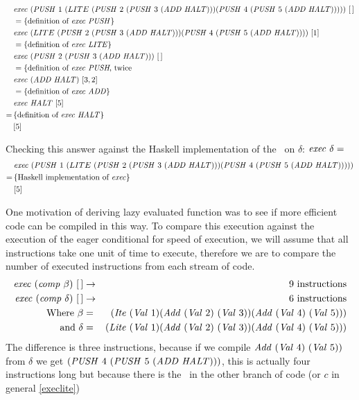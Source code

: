 \documentclass {article}
\begin{document}
\begin{align*}
&\mathit{exec\ } (\mathit{PUSH\ } 1\ (LITE\ (\mathit{PUSH\ } 2\ (\mathit{PUSH\ } 3\ (\mathit{ADD\ }  \mathit{HALT}))) (\mathit{PUSH\ } 4\ (\mathit{PUSH\ } 5\ (\mathit{ADD\ }  \mathit{HALT})))))\ [\, ] \\
&=\{\mbox{definition of \textit{exec}\ \textit{PUSH}} \} \\
&\mathit{exec\ } (LITE\ (\mathit{PUSH\ } 2\ (\mathit{PUSH\ } 3\ (\mathit{ADD\ }  \mathit{HALT}))) (\mathit{PUSH\ } 4\ (\mathit{PUSH\ } 5\ (\mathit{ADD\ }  \mathit{HALT}))))\ [1] \\
&=\{\mbox{definition of \textit{exec}\ \textit{LITE}} \} \\
&\mathit{exec\ } (\mathit{PUSH\ } 2\ (\mathit{PUSH\ } 3\ (\mathit{ADD\ }  \mathit{HALT})))\ [\, ] \\
&=\{\mbox{definition of \textit{exec}\ \textit{PUSH}, twice} \\
&\mathit{exec\ } (\mathit{ADD\ }  \mathit{HALT})\ [3, 2] \\
&=\{\mbox{definition of \textit{exec}\ \textit{ADD}} \} \\
&\mathit{exec\ } \mathit{HALT} \ [5] \\
=\, & \{\mbox{definition of \textit{exec}\ \textit{HALT}}\} \\
&[5]
\end{align*}

Checking this answer against the Haskell 
implementation of the \vm\ on $\delta$:
\( \mathit{exec\ } \delta = \)
\begin{align*}	
&\Exec (\PUSH 1\ (LITE\ 
	(\PUSH 2\ (\PUSH 3\ (\ADD  \HALT))) 
	(\PUSH 4\ (\PUSH 5\ (\ADD  \HALT))))) \\
=\, &\{ \mbox{Haskell implementation of \exec} \} \\
&[5]
\end{align*}

One motivation of deriving lazy evaluated function
was to see if more efficient code can be compiled
in this way. 
To compare this execution against the execution of 
the eager conditional for speed of execution,
we will assume that all instructions take one unit of time
to execute, therefore we are to compare the number of 
executed instructions from each stream of code.
\begin{eqnarray*}
\mathit{exec\ } (\mathit{comp\ } \beta)\ [\, ] &\rightarrow& \mbox{9 instructions} \\
\mathit{exec\ } (\mathit{comp\ } \delta)\ [\, ] &\rightarrow& \mbox{6 instructions} \\
\mbox{Where } \beta &=& (\mathit{Ite\ } (\mathit{Val\ } 1)(\mathit{Add\ } (\mathit{Val\ } 2)\ (\mathit{Val\ } 3))
									(\mathit{Add\ } (\mathit{Val\ } 4)\ (\mathit{Val\ } 5))) \\
\mbox{and } \delta &=& (\mathit{Lite\ } (\mathit{Val\ } 1)(\mathit{Add\ } (\mathit{Val\ } 2)\ (\mathit{Val\ } 3))
										(\mathit{Add\ } (\mathit{Val\ } 4)\ (\mathit{Val\ } 5))) \\
\end{eqnarray*}
The difference is three instructions, 
because if we compile  \( \mathit{Add\ } (\mathit{Val\ } 4)\ (\mathit{Val\ } 5)) \)
from $\delta$
we get \( (\PUSH 4\ (\PUSH 5\ (\ADD  \HALT)))\),
this is actually four instructions long but because 
there is the \HALTt\ in the other branch of code 
(or $c$ in general \ref{execlite})
\end{document}
